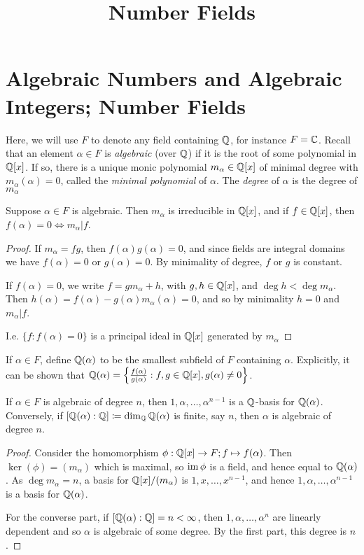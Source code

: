 \documentclass[10pt,a4paper]{article}
\title{Number Fields}
\begin{document}
\maketitle

\section{Algebraic Numbers and Algebraic Integers; Number Fields}
Here, we will use $F$ to denote any field containing $\mathbb{Q}$, for instance $F = \mathbb{C}$. Recall that an element $\alpha \in F$ is \emph{algebraic} (over $\mathbb{Q}$) if it is the root of some polynomial in $\mathbb{Q}[x]$. If so, there is a unique monic polynomial $m_{\alpha} \in \mathbb{Q}[x]$ of minimal degree with $m_{\alpha}(\alpha) = 0$, called the \emph{minimal polynomial} of $\alpha$. The \emph{degree} of $\alpha$ is the degree of $m_{\alpha}$

\begin{proposition}
Suppose $\alpha \in F$ is algebraic. Then $m_{\alpha}$ is irreducible in $\mathbb{Q}[x]$, and if $f \in \mathbb{Q}[x]$, then $f(\alpha) = 0 \iff m_{\alpha} | f$.
\end{proposition}
\begin{proof}
If $m_{\alpha} = fg$, then $f(\alpha)g(\alpha) = 0$, and since fields are integral domains we have $f(\alpha) = 0$ or $g(\alpha) = 0$. By minimality of degree, $f$ or $g$ is constant.

If $f(\alpha) = 0$, we write $f = gm_{\alpha} + h$, with $g, h \in \mathbb{Q}[x]$, and $\deg h < \deg m_{\alpha}$. Then $h(\alpha) = f(\alpha) - g(\alpha)m_{\alpha}(\alpha) = 0$, and so by minimality $h = 0$ and $m_{\alpha}|f$.

I.e. $\{f : f(\alpha) = 0\}$ is a principal ideal in $\mathbb{Q}[x]$ generated by $m_{\alpha}$
\end{proof}

If $\alpha \in F$, define $\mathbb{Q}(\alpha)$ to be the smallest subfield of $F$ containing $\alpha$. Explicitly, it can be shown that $\mathbb{Q}(\alpha) = \left\{ \frac{f(\alpha)}{g(\alpha)} : f, g \in \mathbb{Q}[x], g(\alpha) \neq 0\right\}$.

\begin{proposition}
If $\alpha \in F$ is algebraic of degree $n$, then $1, \alpha, \ldots, \alpha^{n-1}$ is a $\mathbb{Q}$-basis for $\mathbb{Q}(\alpha)$. Conversely, if $[\mathbb{Q}(\alpha): \mathbb{Q}] \coloneqq \dim_{\mathbb{Q}} \mathbb{Q}(\alpha)$ is finite, say $n$, then $\alpha$ is algebraic of degree $n$.
\end{proposition}
\begin{proof}
Consider the homomorphism $\phi:\mathbb{Q}[x] \to F; f\mapsto f(\alpha)$. Then $\ker(\phi) = (m_\alpha)$ which is maximal, so $\operatorname{im} \phi$ is a field, and hence equal to $\mathbb{Q}(\alpha)$. As $\deg m_{\alpha} = n$, a basis for $\mathbb{Q}[x]/(m_\alpha)$ is $1, x, \ldots, x^{n-1}$, and hence $1, \alpha, \ldots, \alpha^{n-1}$ is a basis for $\mathbb{Q}(\alpha)$.

For the converse part, if $[\mathbb{Q}(\alpha):\mathbb{Q}] = n < \infty$, then $1, \alpha, \ldots, \alpha^n$ are linearly dependent and so $\alpha$ is algebraic of some degree. By the first part, this degree is $n$.
\end{proof}
\end{document}
